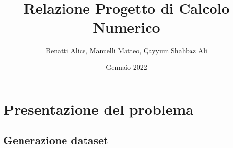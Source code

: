 \documentclass{article}
\title{\textbf{Relazione Progetto di Calcolo Numerico}}
\author{Benatti Alice, Manuelli Matteo, Qayyum Shahbaz Ali}
\date{Gennaio 2022}
\begin{document}
\maketitle

\tableofcontents

\begin{comment}
Relazione

1. Riportare e commentare i risultati ottenuti nei punti 2. 3. (e 4.) 
su un immagine del set creato e su altre due immagini in bianco e nero 
(fotografiche/mediche/astronomiche)
2. Riportare delle tabelle con le misure di PSNR e MSE ottenute al 
variare dei parametri (dimensione kernel, valore di sigma, la 
deviazione standard del rumore, il parametro di regolarizzazione). 
3. Calcolare sull’intero set di immagini medie e deviazione standard 
delle metriche per alcuni valori fissati dei parametri.  
4. Analizzare su 2 esecuzioni le proprietà dei metodi numerici 
utilizzati (gradiente coniugato e gradiente) in termini di numero di 
iterazioni, andamento dell’errore, della funzione obiettivo, norma del 
gradiente. 
\end{comment}

\section{Presentazione del problema}

    \subsection{Generazione dataset}
    
    
    

\end{document}
